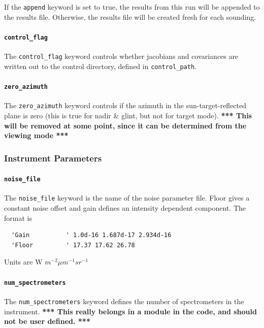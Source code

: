 \documentclass{article}
\begin{document}
If the \texttt{append} keyword is set to true, the results from this run
will be appended to the results file.  Otherwise, the results file
will be created fresh for each sounding.

\paragraph{\texttt{control\_flag}}

The \texttt{control\_flag} keyword controls whether jacobians and
covariances are written out to the control directory, defined in
\texttt{control\_path}.

\paragraph{\texttt{zero\_azimuth}}

The \texttt{zero\_azimuth} keyword controls if the azimuth in the
sun-target-reflected plane is zero (this is true for nadir \& glint,
but not for target mode).  \textbf{*** This will be removed at some
point, since it can be determined from the viewing mode ***}

\subsubsection{Instrument Parameters}

\paragraph{\texttt{noise\_file}}

The \texttt{noise\_file} keyword is the name of the noise parameter
file.  Floor gives a constant noise offset and gain defines an
intensity dependent component.  The format is
\begin{verbatim}
  'Gain          ' 1.0d-16 1.687d-17 2.934d-16
  'Floor         ' 17.37 17.62 26.78
\end{verbatim}
Units are W \ensuremath{m^{-2}{\mu}m^{-1}sr^{-1}}

\paragraph{\texttt{num\_spectrometers}}

The \texttt{num\_spectrometers} keyword defines the number of
spectrometers in the instrument.  \textbf{*** This really belongs in a
module in the code, and should not be user defined. ***}
\end{document}
